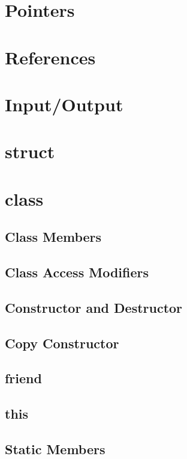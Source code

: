 \documentclass[10pt,a4paper]{scrartcl}
\begin{document}
\begin{multicols*}{2}
\section{Pointers}

\section{References}

\section{Input/Output}

\section{struct}

\section{class}

\subsection{Class Members}

\subsection{Class Access Modifiers}

\subsection{Constructor and Destructor}

\subsection{Copy Constructor}

\subsection{friend}

\subsection{this}

\subsection{Static Members}


\end{multicols*}
\end{document}

